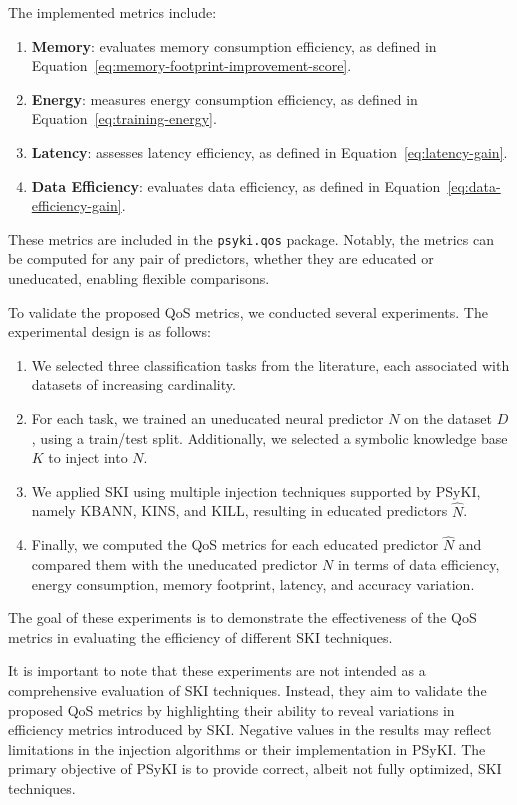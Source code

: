 %
The implemented metrics include:
%
\begin{enumerate}
    \item \textbf{Memory}: evaluates memory consumption efficiency, as defined in Equation~\eqref{eq:memory-footprint-improvement-score}.
    \item \textbf{Energy}: measures energy consumption efficiency, as defined in Equation~\eqref{eq:training-energy}.
    \item \textbf{Latency}: assesses latency efficiency, as defined in Equation~\eqref{eq:latency-gain}.
    \item \textbf{Data Efficiency}: evaluates data efficiency, as defined in Equation~\eqref{eq:data-efficiency-gain}.
\end{enumerate}
%
These metrics are included in the \texttt{psyki.qos} package.
%
Notably, the metrics can be computed for any pair of predictors, whether they are educated or uneducated, enabling flexible comparisons.

%
To validate the proposed \gls{QoS} metrics, we conducted several experiments.
%
The experimental design is as follows:
%
\begin{enumerate}
    \item We selected three classification tasks from the literature, each associated with datasets of increasing cardinality.
    \item For each task, we trained an uneducated neural predictor \(N\) on the dataset \(D\), using a train/test split.
    Additionally, we selected a symbolic knowledge base \(K\) to inject into \(N\).
    \item We applied \gls{SKI} using multiple injection techniques supported by \gls{PSyKI}, namely \gls{KBANN}, \gls{KINS}, and \gls{KILL}, resulting in educated predictors \(\hat{N}\).
    \item Finally, we computed the \gls{QoS} metrics for each educated predictor \(\hat{N}\) and compared them with the uneducated predictor \(N\) in terms of data efficiency, energy consumption, memory footprint, latency, and accuracy variation.
\end{enumerate}
%
The goal of these experiments is to demonstrate the effectiveness of the \gls{QoS} metrics in evaluating the efficiency of different \gls{SKI} techniques.

%
It is important to note that these experiments are not intended as a comprehensive evaluation of \gls{SKI} techniques.
%
Instead, they aim to validate the proposed \gls{QoS} metrics by highlighting their ability to reveal variations in efficiency metrics introduced by \gls{SKI}.
%
Negative values in the results may reflect limitations in the injection algorithms or their implementation in \gls{PSyKI}.
%
The primary objective of \gls{PSyKI} is to provide correct, albeit not fully optimized, \gls{SKI} techniques.


